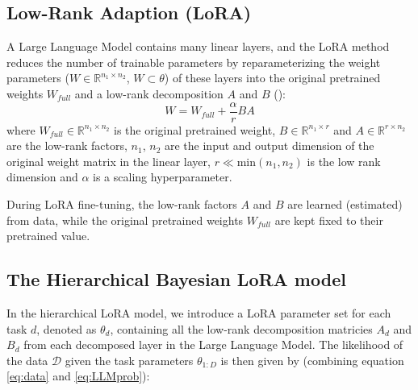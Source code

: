 \documentclass[fullpaper]{nldl}
\newcommand{\R}{\mathbb{R}}
\begin{document}
\subsection{Low-Rank Adaption (LoRA)}
A Large Language Model contains many linear layers, and the LoRA method reduces the number of trainable parameters by reparameterizing the weight parameters ($W \in \R^{n_1 \times n_2}$, $W \subset \theta$) of these layers into the original pretrained weights $W_{full}$ and a low-rank decomposition $A$ and $B$ (\cite{hayou_lora_2024}):
\begin{equation} \label{eq:LoRA}
    W = W_{full} + \frac{\alpha}{r} BA 
\end{equation}
%
where 
$W_{full} \in \R^{n_1 \times n_2}$ is the original pretrained weight, 
$B \in \R^{n_1 \times r}$ and $A \in \R^{r \times n_2}$ are the low-rank factors, 
$n_1$, $n_2$ are the input and output dimension of the original weight matrix in the linear layer,
$r \ll \text{min}(n_1, n_2)$ is the low rank dimension 
and $\alpha$ is a scaling hyperparameter.

During LoRA fine-tuning, the low-rank factors $A$ and $B$ are learned (estimated) from data, while the original pretrained weights $W_{full}$ are kept fixed to their pretrained value.

\subsection{The Hierarchical Bayesian LoRA model} \label{sec:BoRA}
In the hierarchical LoRA model, we introduce a LoRA parameter set for each task $d$, denoted as $\theta_d$, containing all the low-rank decomposition matricies $A_d$ and $B_d$ from each decomposed layer in the Large Language Model. The likelihood of the data $\mathcal{D}$ given the task parameters $\theta_{1:D}$ is then given by (combining equation \ref{eq:data} and \ref{eq:LLMprob}):
\end{document}
